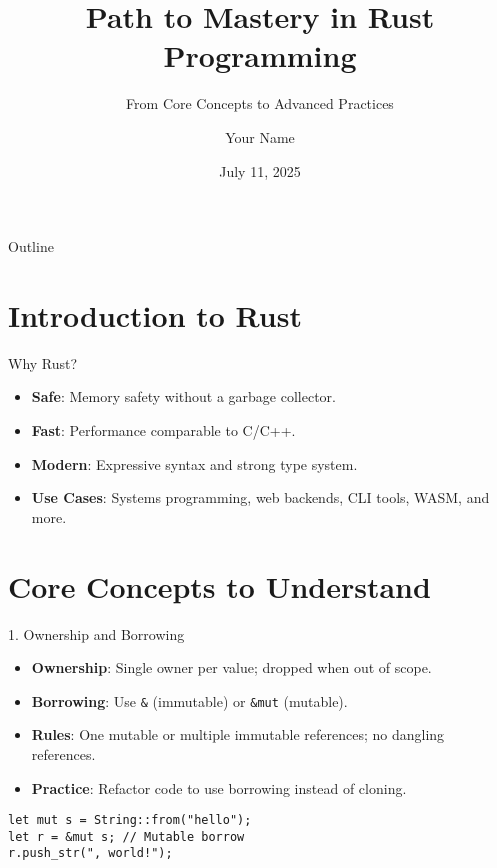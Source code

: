 \documentclass[10pt]{beamer}
\title{Path to Mastery in Rust Programming}
\subtitle{From Core Concepts to Advanced Practices}
\author{Your Name}
\date{July 11, 2025}
\begin{document}
\begin{frame}
    \titlepage
\end{frame}

\begin{frame}{Outline}
    \tableofcontents
\end{frame}

\section{Introduction to Rust}
\begin{frame}{Why Rust?}
    \begin{itemize}
        \item \textbf{Safe}: Memory safety without a garbage collector.
        \item \textbf{Fast}: Performance comparable to C/C++.
        \item \textbf{Modern}: Expressive syntax and strong type system.
        \item \textbf{Use Cases}: Systems programming, web backends, CLI tools, WASM, and more.
    \end{itemize}
\end{frame}

\section{Core Concepts to Understand}
\begin{frame}{1. Ownership and Borrowing}
    \begin{itemize}
        \item \textbf{Ownership}: Single owner per value; dropped when out of scope.
        \item \textbf{Borrowing}: Use \texttt{\&} (immutable) or \texttt{\&mut} (mutable).
        \item \textbf{Rules}: One mutable or multiple immutable references; no dangling references.
        \item \textbf{Practice}: Refactor code to use borrowing instead of cloning.
    \end{itemize}
    \begin{lstlisting}
let mut s = String::from("hello");
let r = &mut s; // Mutable borrow
r.push_str(", world!");
    \end{lstlisting}
\end{frame}
\end{document}
